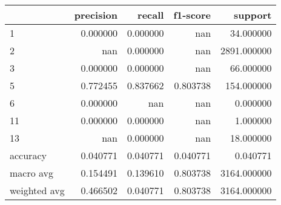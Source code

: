 \begin{tabular}{lrrrr}
\toprule
 & precision & recall & f1-score & support \\
\midrule
1 & 0.000000 & 0.000000 & nan & 34.000000 \\
2 & nan & 0.000000 & nan & 2891.000000 \\
3 & 0.000000 & 0.000000 & nan & 66.000000 \\
5 & 0.772455 & 0.837662 & 0.803738 & 154.000000 \\
6 & 0.000000 & nan & nan & 0.000000 \\
11 & 0.000000 & 0.000000 & nan & 1.000000 \\
13 & nan & 0.000000 & nan & 18.000000 \\
accuracy & 0.040771 & 0.040771 & 0.040771 & 0.040771 \\
macro avg & 0.154491 & 0.139610 & 0.803738 & 3164.000000 \\
weighted avg & 0.466502 & 0.040771 & 0.803738 & 3164.000000 \\
\bottomrule
\end{tabular}
